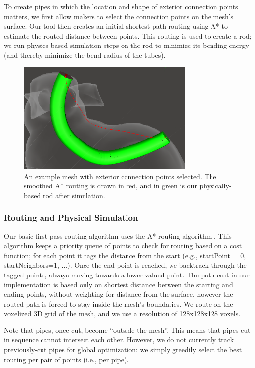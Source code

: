 To create pipes in which the location and shape of exterior connection points matters, we first allow makers to select the connection points on the mesh's surface. Our tool then creates an initial shortest-path routing using A* to estimate the routed distance between points.  This routing is used to create a rod; we run physics-based simulation steps on the rod to minimize its bending energy (and thereby minimize the bend radius of the tubes).

\begin{figure}[h!]
\centering
    \includegraphics[width=3.4in]{figures/exterior.png}
\caption{An example mesh with exterior connection points selected.  The smoothed A* routing is drawn in {\color{red}red}, and in {\color{tovi}green} is our physically-based rod after simulation. }
\label{fig:tool-process-exterior}
\end{figure}

\subsubsection{Routing and Physical Simulation}

Our basic first-pass routing algorithm uses the A* routing algorithm \cite{Hart-Astar}.  This algorithm keeps a priority queue of points to check for routing based on a cost function; for each point it tags the distance from the start (e.g., startPoint = 0, startNeighbors=1, ...).  Once the end point is reached, we backtrack through the tagged points, always moving towards a lower-valued point.  The path cost in our implementation is based only on shortest distance between the starting and ending points, without weighting for distance from the surface, however the routed path is forced to stay inside the mesh's boundaries.  We route on the voxelized 3D grid of the mesh, and we use a resolution of 128x128x128 voxels. 

Note that pipes, once cut, become ``outside the mesh''.  This means that pipes cut in sequence cannot intersect each other.  However, we do not currently track previously-cut pipes for global optimization: we simply greedily select the best routing per pair of points (i.e., per pipe).

